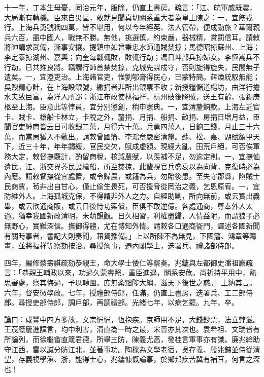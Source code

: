 \begin{pinyinscope}
十一年，丁本生母憂，同治元年，服除，仍直上書房。疏言：「江、皖軍威既震，大局漸有轉機。臣來自災區，敢就見聞真切關系重大者為皇上陳之：一，宜飭戎行。上海兵勇號稱四萬，皆不堪用，何以今年經英、法人管帶，便成勁旅？華爾親兵六百，盡中國人，戰無不勝。無他，挑選慎，約束嚴，器械精，賞罰信耳。請敕將帥講求武備，漸事安攘。提鎮中如曾秉忠水師通賊焚掠；馬德昭掠蘇州、上海；李定泰掠湖州、嘉興；向奎每戰輒敗，敗輒行劫；馮日坤部兵掠婦女。李恆嵩兵不行劫，已共推良將。竊謂行師首禁焚掠，克城先謀戍守，否則旋得旋失，民間無孑遺矣。一，宜澄吏治。上海諸官吏，惟劉郇膏得民心，已蒙特簡。薛煥統馭無能；吳煦精心計，在上海設銀號，繳捐者非所出銀票不收；新授糧儲道楊坊，由洋行擔水夫致巨富，為洋人所鄙；浙江布政使林福祥，杭州破後降賊，送王有齡、張錫庚柩至上海。臣意此等悖員，宜分別懲創，稍申憲典。一，宜清釐餉款。上海左近官卡、賊卡、槍船卡林立，卡稅之外，釐捐、月捐、船捐、畝捐、房捐日增月益，臣聞官吏紳商皆云日可收銀二萬，月得六十萬。兵勇四萬人，日餉三錢，月止三十六萬，而當局猶入不敷出。請敕曾國籓、李鴻章嚴密清釐。蘇、松、嘉、湖賦額甲天下，近三十年，年年蠲緩，官民交欠，賦成虛額。現經大亂，田荒戶絕，可否俟軍務大定，敕督撫覈計，酌留商稅，核減農賦，以羨補不足，勿逾定則。一，宜撫恤遺民。江、浙交界莠民設槍船，所至焚掠，此輩視官兵盛衰以為向背，克復時必為內應。請敕督撫從宜處置，或令歸農，或籍為兵，勿貽後患。至失守郡縣，陷賊士民商賈，茍非出自甘心，僅止偷生畏死，可否援脅從罔治之義，乞恩原宥。一，宜防維外人。上海孤城克保，不得謂非外人之力。自經助剿，所向無前，或云實出義舉，或云欲通商販，或云日後恃功索償，臣俱不敢逆億。各處通商，尊奉外人太過。猶幸我國新政清明，未萌覬覦。日久相習，利權盡歸，人情益附，而謂狼子必無野心，實難深信。撫御得體，尤在博知外情。請敕各口通商衙門，譯述各國新聞有關時事者，書記大則奏聞，藉資豫備。」上以所陳不為無見，下國籓、鴻章等籌畫，並將福祥等察劾按治。尋授詹事，遷內閣學士，迭署兵、禮諸部侍郎。

四年，編修蔡壽祺疏劾恭親王，命大學士倭仁等察奏。兆鏞與左都御史潘祖廕疏言：「恭親王輔政以來，功過久蒙睿照，重臣進退，關系安危。尚祈持平用中，熟思審處，察其悔過，予以轉圜。庶無紊黜陟大綱，滋天下後世之惑。」上納其言。六年，督安徽學政。七年，授禮部侍郎，任滿，仍直上書房，迭署兵、工二部侍郎。尋授吏部侍郎，調戶部，再調禮部。光緒七年，以病乞罷。九年，卒。

論曰：咸豐中四方多故，文宗悒悒，恆抱疾。京師用不足，大錢鈔票，法立弊滋。王茂廕屢進讜言，均中利害，清直為一時之最，宋晉亦其次也。袁希祖、文瑞皆有所論列，而徐繼畬直箴君德，所舉三防，陳義尤高，發桂言軍事亦有識。廉兆綸助守江西，雷以諴分防江北，並著事功。陶樑為文學老宿，吳存義、殷兆鏞並侍從清望，存義視學滇、浙，能得士心，兆鏞慷慨論事，於鄉邦疾苦冀有補苴，何言之深也！


\end{pinyinscope}